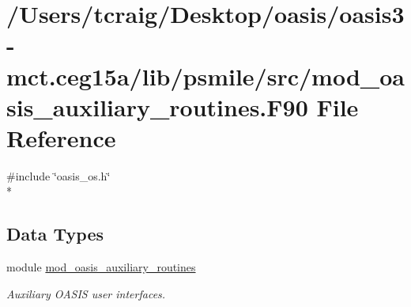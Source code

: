 \hypertarget{mod__oasis__auxiliary__routines_8_f90}{\section{/\+Users/tcraig/\+Desktop/oasis/oasis3-\/mct.ceg15a/lib/psmile/src/mod\+\_\+oasis\+\_\+auxiliary\+\_\+routines.F90 File Reference}
\label{mod__oasis__auxiliary__routines_8_f90}
}
{\ttfamily \#include \char`\"{}oasis\+\_\+os.\+h\char`\"{}}\\*
\subsection*{Data Types}
\begin{DoxyCompactItemize}
\item 
module \hyperlink{classmod__oasis__auxiliary__routines}{mod\+\_\+oasis\+\_\+auxiliary\+\_\+routines}
\begin{DoxyCompactList}\small\item\em Auxiliary O\+A\+S\+I\+S user interfaces. \end{DoxyCompactList}\end{DoxyCompactItemize}

